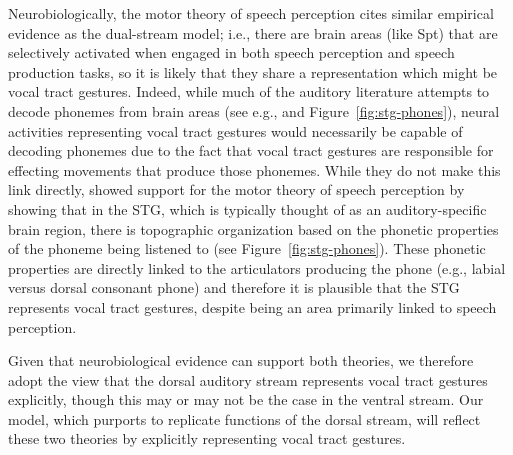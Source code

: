 Neurobiologically,
the motor theory of speech perception
cites similar empirical evidence as
the dual-stream model;
i.e., there are brain areas (like Spt)
that are selectively activated
when engaged in both speech perception
and speech production tasks,
so it is likely that they share
a representation which might be vocal tract gestures.
Indeed, while much of the auditory literature
attempts to decode phonemes
from brain areas
(see e.g., \citealt{mesgarani2014}
and Figure~\ref{fig:stg-phones}),
neural activities representing vocal tract gestures
would necessarily be capable of
decoding phonemes due to the fact that
vocal tract gestures are responsible
for effecting movements that produce
those phonemes.
While they do not make this link directly,
\citet{mesgarani2014}
showed support for
the motor theory of speech perception
by showing that in the STG,
which is typically thought of
as an auditory-specific brain region,
there is topographic organization
based on the phonetic properties
of the phoneme being listened to
(see Figure~\ref{fig:stg-phones}).
These phonetic properties are
directly linked to the articulators
producing the phone
(e.g., labial versus dorsal consonant phone)
and therefore it is plausible that
the STG represents vocal tract gestures,
despite being an area primarily linked
to speech perception.


Given that neurobiological evidence can
support both theories,
we therefore adopt the view that
the dorsal auditory stream
represents vocal tract gestures explicitly,
though this may or may not be the case
in the ventral stream.
Our model, which purports to replicate
functions of the dorsal stream,
will reflect these two theories
by explicitly representing vocal tract gestures.

